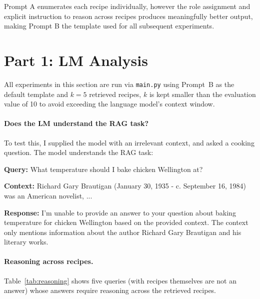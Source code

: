 \documentclass[a4paper,11pt]{article}
\begin{document}
Prompt A enumerates each recipe individually, however the role assignment and explicit instruction to reason across recipes produces meaningfully better output, making Prompt B the template used for all subsequent experiments.
\clearpage
\section*{Part 1: LM Analysis}
\label{sec:qualitative-lm}

All experiments in this section are run via \texttt{main.py} using Prompt~B as the default template and $k=5$ retrieved recipes, $k$ is kept smaller than the evaluation value of 10 to avoid exceeding the language model's context window.
\paragraph{Does the LM understand the RAG task?}
To test this, I supplied the model with an irrelevant context, and asked a cooking question. The model understands the RAG task:

\begin{tcolorbox}[title=irrelevant context, fontupper=\raggedright, breakable]
\textbf{Query:} {\small\ttfamily What temperature should I bake chicken Wellington at?}

\textbf{Context:} {\small\ttfamily Richard Gary Brautigan (January 30, 1935 - c. September 16, 1984) was an American novelist, ...}

\textbf{Response:} {\small\ttfamily I'm unable to provide an answer to your question about baking temperature for chicken Wellington based on the provided context. The context only mentions information about the author Richard Gary Brautigan and his literary works.}
\end{tcolorbox}

\paragraph{Reasoning across recipes.}
Table~\ref{tab:reasoning} shows five queries (with recipes themselves are not an answer) whose answers require reasoning across the retrieved recipes.
\end{document}
